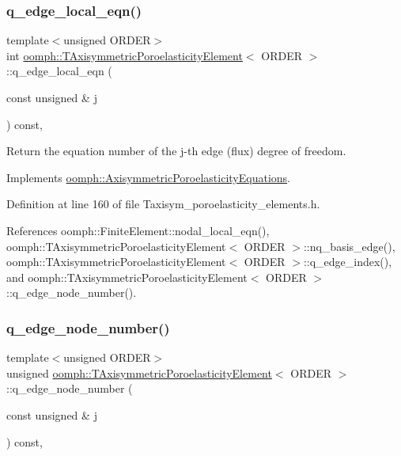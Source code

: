\subsubsection{\texorpdfstring{q\+\_\+edge\+\_\+local\+\_\+eqn()}{q\_edge\_local\_eqn()}}
{\footnotesize\ttfamily template$<$unsigned O\+R\+D\+ER$>$ \\
int \hyperlink{classoomph_1_1TAxisymmetricPoroelasticityElement}{oomph\+::\+T\+Axisymmetric\+Poroelasticity\+Element}$<$ O\+R\+D\+ER $>$\+::q\+\_\+edge\+\_\+local\+\_\+eqn (\begin{DoxyParamCaption}\item[{const unsigned \&}]{j }\end{DoxyParamCaption}) const\hspace{0.3cm}{\ttfamily [inline]}, {\ttfamily [virtual]}}



Return the equation number of the j-\/th edge (flux) degree of freedom. 



Implements \hyperlink{classoomph_1_1AxisymmetricPoroelasticityEquations_a2cc9733c35e65c880246b3b072abb263}{oomph\+::\+Axisymmetric\+Poroelasticity\+Equations}.



Definition at line 160 of file Taxisym\+\_\+poroelasticity\+\_\+elements.\+h.



References oomph\+::\+Finite\+Element\+::nodal\+\_\+local\+\_\+eqn(), oomph\+::\+T\+Axisymmetric\+Poroelasticity\+Element$<$ O\+R\+D\+E\+R $>$\+::nq\+\_\+basis\+\_\+edge(), oomph\+::\+T\+Axisymmetric\+Poroelasticity\+Element$<$ O\+R\+D\+E\+R $>$\+::q\+\_\+edge\+\_\+index(), and oomph\+::\+T\+Axisymmetric\+Poroelasticity\+Element$<$ O\+R\+D\+E\+R $>$\+::q\+\_\+edge\+\_\+node\+\_\+number().

\mbox{\label{classoomph_1_1TAxisymmetricPoroelasticityElement_a6a76ba9fafcb226230340a6d1d931094}} 
\subsubsection{\texorpdfstring{q\+\_\+edge\+\_\+node\+\_\+number()}{q\_edge\_node\_number()}}
{\footnotesize\ttfamily template$<$unsigned O\+R\+D\+ER$>$ \\
unsigned \hyperlink{classoomph_1_1TAxisymmetricPoroelasticityElement}{oomph\+::\+T\+Axisymmetric\+Poroelasticity\+Element}$<$ O\+R\+D\+ER $>$\+::q\+\_\+edge\+\_\+node\+\_\+number (\begin{DoxyParamCaption}\item[{const unsigned \&}]{j }\end{DoxyParamCaption}) const\hspace{0.3cm}{\ttfamily [inline]}, {\ttfamily [virtual]}}



